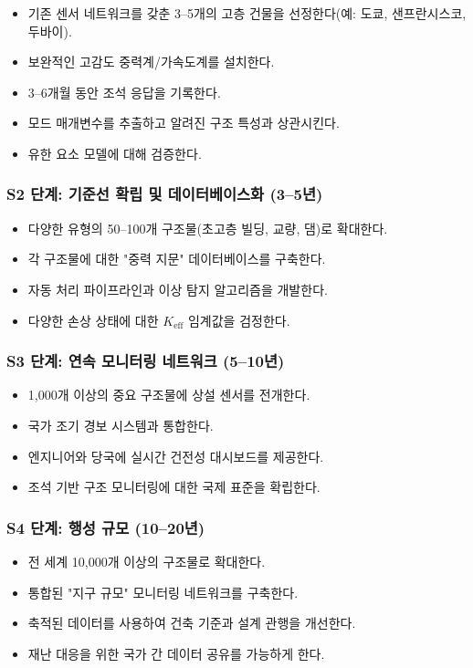 \documentclass[12pt,a4paper]{article}
\theoremstyle{remark}
\begin{document}
	\begin{itemize}
		\item 기존 센서 네트워크를 갖춘 3–5개의 고층 건물을 선정한다(예: 도쿄, 샌프란시스코, 두바이).
		\item 보완적인 고감도 중력계/가속도계를 설치한다.
		\item 3–6개월 동안 조석 응답을 기록한다.
		\item 모드 매개변수를 추출하고 알려진 구조 특성과 상관시킨다.
		\item 유한 요소 모델에 대해 검증한다.
	\end{itemize}
	
	\subsubsection{S2 단계: 기준선 확립 및 데이터베이스화 (3–5년)}
	
	\begin{itemize}
		\item 다양한 유형의 50–100개 구조물(초고층 빌딩, 교량, 댐)로 확대한다.
		\item 각 구조물에 대한 "중력 지문" 데이터베이스를 구축한다.
		\item 자동 처리 파이프라인과 이상 탐지 알고리즘을 개발한다.
		\item 다양한 손상 상태에 대한 \(K_{\mathrm{eff}}\) 임계값을 검정한다.
	\end{itemize}
	
	\subsubsection{S3 단계: 연속 모니터링 네트워크 (5–10년)}
	
	\begin{itemize}
		\item 1,000개 이상의 중요 구조물에 상설 센서를 전개한다.
		\item 국가 조기 경보 시스템과 통합한다.
		\item 엔지니어와 당국에 실시간 건전성 대시보드를 제공한다.
		\item 조석 기반 구조 모니터링에 대한 국제 표준을 확립한다.
	\end{itemize}
	
	\subsubsection{S4 단계: 행성 규모 (10–20년)}
	
	\begin{itemize}
		\item 전 세계 10,000개 이상의 구조물로 확대한다.
		\item 통합된 "지구 규모" 모니터링 네트워크를 구축한다.
		\item 축적된 데이터를 사용하여 건축 기준과 설계 관행을 개선한다.
		\item 재난 대응을 위한 국가 간 데이터 공유를 가능하게 한다.
	\end{itemize}
	
\end{document}
